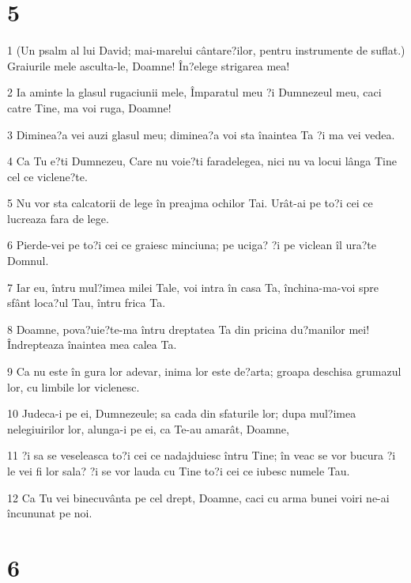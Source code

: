 \chapter{5}

\par 1 (Un psalm al lui David; mai-marelui cântare?ilor, pentru instrumente de suflat.) Graiurile mele asculta-le, Doamne! În?elege strigarea mea!
\par 2 Ia aminte la glasul rugaciunii mele, Împaratul meu ?i Dumnezeul meu, caci catre Tine, ma voi ruga, Doamne!
\par 3 Diminea?a vei auzi glasul meu; diminea?a voi sta înaintea Ta ?i ma vei vedea.
\par 4 Ca Tu e?ti Dumnezeu, Care nu voie?ti faradelegea, nici nu va locui lânga Tine cel ce viclene?te.
\par 5 Nu vor sta calcatorii de lege în preajma ochilor Tai. Urât-ai pe to?i cei ce lucreaza fara de lege.
\par 6 Pierde-vei pe to?i cei ce graiesc minciuna; pe uciga? ?i pe viclean îl ura?te Domnul.
\par 7 Iar eu, întru mul?imea milei Tale, voi intra în casa Ta, închina-ma-voi spre sfânt loca?ul Tau, întru frica Ta.
\par 8 Doamne, pova?uie?te-ma întru dreptatea Ta din pricina du?manilor mei! Îndrepteaza înaintea mea calea Ta.
\par 9 Ca nu este în gura lor adevar, inima lor este de?arta; groapa deschisa grumazul lor, cu limbile lor viclenesc.
\par 10 Judeca-i pe ei, Dumnezeule; sa cada din sfaturile lor; dupa mul?imea nelegiuirilor lor, alunga-i pe ei, ca Te-au amarât, Doamne,
\par 11 ?i sa se veseleasca to?i cei ce nadajduiesc întru Tine; în veac se vor bucura ?i le vei fi lor sala? ?i se vor lauda cu Tine to?i cei ce iubesc numele Tau.
\par 12 Ca Tu vei binecuvânta pe cel drept, Doamne, caci cu arma bunei voiri ne-ai încununat pe noi.

\chapter{6}

